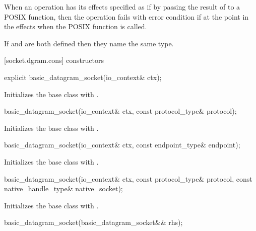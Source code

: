 \pnum
When an operation has its effects specified as if by passing the result of  to a POSIX function, then the operation fails with error condition  if  at the point in the effects when the POSIX function is called.

\pnum
If  and 
are both defined then they name the same type.

[socket.dgram.cons]{ constructors}

\begin{itemdecl}
explicit basic_datagram_socket(io_context& ctx);
\end{itemdecl}

\begin{itemdescr}
\pnum
\effects Initializes the base class with .
\end{itemdescr}

\begin{itemdecl}
basic_datagram_socket(io_context& ctx, const protocol_type& protocol);
\end{itemdecl}

\begin{itemdescr}
\pnum
\effects Initializes the base class with .
\end{itemdescr}

\begin{itemdecl}
basic_datagram_socket(io_context& ctx, const endpoint_type& endpoint);
\end{itemdecl}

\begin{itemdescr}
\pnum
\effects Initializes the base class with .
\end{itemdescr}

\begin{itemdecl}
basic_datagram_socket(io_context& ctx, const protocol_type& protocol,
                      const native_handle_type& native_socket);
\end{itemdecl}

\begin{itemdescr}
\pnum
\effects Initializes the base class with .
\end{itemdescr}

\begin{itemdecl}
basic_datagram_socket(basic_datagram_socket&& rhs);
\end{itemdecl}

